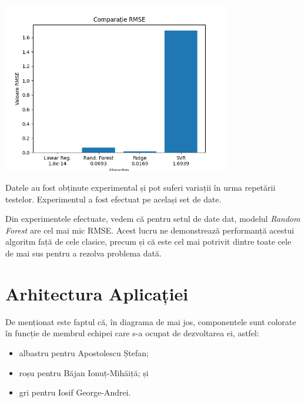 \documentclass{article}
\begin{document}
\vspace{0.3cm}
\begin{center}
    \includegraphics[width=10cm]{images/rmse.png}
    \label{fig:1}
    \captionsetup{justification=centering,margin=1cm}
\end{center}
\vspace{0.3cm}

Datele au fost obținute experimental și pot suferi variații în urma repetării testelor. Experimentul a fost efectuat pe același set de date.

Din experimentele efectuate, vedem că pentru setul de date dat, modelul \textit{Random Forest} are cel mai mic RMSE. Acest lucru ne demonstrează performanță acestui algoritm față de cele clasice, precum și că este cel mai potrivit dintre toate cele de mai sus pentru a rezolva problema dată.

\section{Arhitectura Aplicației}

De menționat este faptul că, în diagrama de mai jos, componentele sunt colorate în funcție de membrul echipei care s-a ocupat de dezvoltarea ei, astfel:
\begin{itemize}
    \item albastru pentru Apostolescu Ștefan;
    \item roșu pentru Băjan Ionuț-Mihăiță; și
    \item gri pentru Iosif George-Andrei.
\end{itemize}
\end{document}
